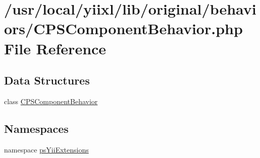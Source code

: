 \hypertarget{CPSComponentBehavior_8php}{
\section{/usr/local/yiixl/lib/original/behaviors/CPSComponentBehavior.php File Reference}
\label{CPSComponentBehavior_8php}
}
\subsection*{Data Structures}
\begin{DoxyCompactItemize}
\item 
class \hyperlink{classCPSComponentBehavior}{CPSComponentBehavior}
\end{DoxyCompactItemize}
\subsection*{Namespaces}
\begin{DoxyCompactItemize}
\item 
namespace \hyperlink{namespacepsYiiExtensions}{psYiiExtensions}
\end{DoxyCompactItemize}
